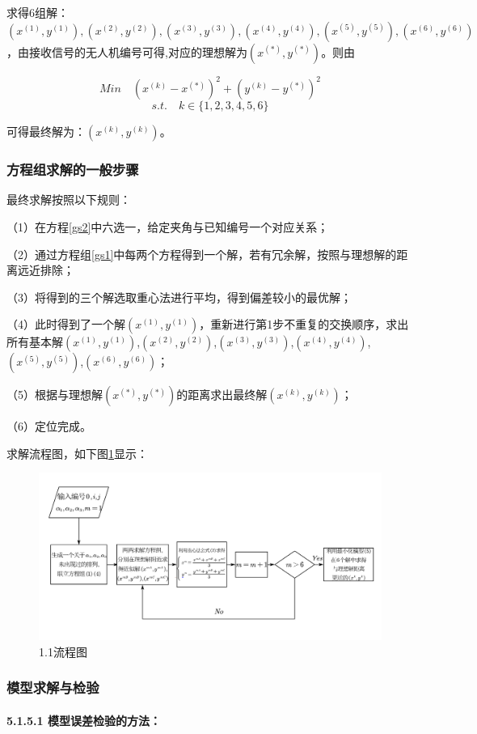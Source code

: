 \documentclass[12pt]{ctexart}
\newcommand\supercite[1]{\textsuperscript{\cite{#1}}}
\begin{document}
\begin{spacing}{1.5}
求得6组解：$(x^{(1)},y^{(1)}),(x^{(2)},y^{(2)}),(x^{(3)},y^{(3)}),(x^{(4)},y^{(4)}),(x^{(5)},y^{(5)}),(x^{(6)},y^{(6)})$，由接收信号的无人机编号可得,对应的理想解为$(x^{(*)},y^{(*)})$。则由

\begin{equation}
Min \quad (x^{(k)}-x^{(*)})^2 + (y^{(k)}-y^{(*)})^2
\end{equation}
$$ s.t.\quad k\in{\{1,2,3,4,5,6\}} $$

可得最终解为：$(x^{(k)},y^{(k)})$。

\subsubsection{方程组求解的一般步骤}
最终求解按照以下规则：

（1）在方程\ref{gs2}中六选一，给定夹角与已知编号一个对应关系；

（2）通过方程组\ref{gs1}中每两个方程得到一个解，若有冗余解，按照与理想解的距离远近排除；

（3）将得到的三个解选取重心法进行平均，得到偏差较小的最优解；

（4）此时得到了一个解$(x^{(1)},y^{(1)})$，重新进行第1步不重复的交换顺序，求出所有基本解$(x^{(1)},y^{(1)})$,$(x^{(2)},y^{(2)})$,$(x^{(3)},y^{(3)})$,$(x^{(4)},y^{(4)})$,$(x^{(5)},y^{(5)})$,$(x^{(6)},y^{(6)})$；

（5）根据与理想解$(x^{(*)},y^{(*)})$的距离求出最终解$(x^{(k)},y^{(k)})$；

（6）定位完成。

求解流程图，如下图\ref{tu12}显示：
\begin{figure}[H]
	\centering
	\includegraphics[width=1.0\textwidth]{1.1流程图.png}
	\caption{1.1流程图}
	\label{tu12}
\end{figure}

\subsubsection{模型求解与检验}
\textbf{5.1.5.1 模型误差检验的方法\supercite{参考文献2}：}


\end{spacing}
\end{document}
